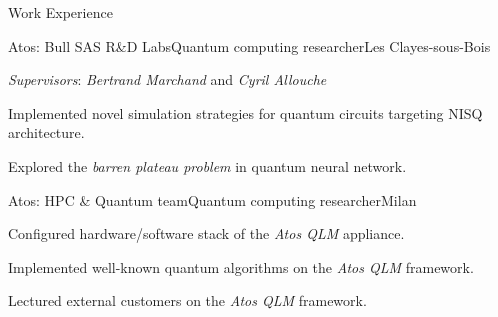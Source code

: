 \documentclass[
	a4paper, %
	10pt, %
]{tresume} %
\begin{document}
\begin{tSection}{Work Experience}
  \begin{tSubsection}{Atos: Bull SAS R\&D Labs}{\origdate{}}{Quantum computing researcher}{Les Clayes-sous-Bois}
  \item \emph{Supervisors}: \emph{Bertrand Marchand} and \emph{Cyril Allouche}
  \item Implemented novel simulation strategies for quantum circuits targeting
    NISQ architecture.
  \item Explored the \emph{barren plateau problem} in quantum neural network.
  \end{tSubsection}

  \begin{tSubsection}{Atos: HPC \& Quantum team}{\origdate{}}{Quantum computing researcher}{Milan}
  \item Configured hardware/software stack of the \textit{Atos QLM} appliance.
  \item Implemented well-known quantum algorithms on the \textit{Atos QLM} framework.
  \item Lectured external customers on the \textit{Atos QLM} framework.
\end{tSubsection}
\end{tSection}
\end{document}
